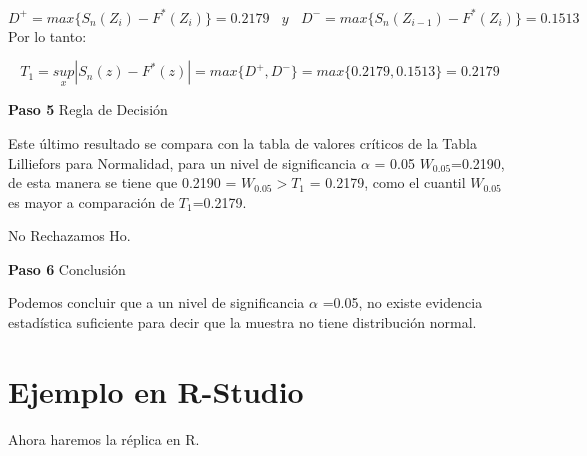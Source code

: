 \documentclass[a4paper,oneside,openany]{book}
\begin{document}
\[ D^+= max \{ S_{n}(Z_{i})-F^*(Z_{i})\}= 0.2179 \ \ \ \ y\ \ \ \ D^-= max \{ S_{n}(Z_{i-1})-F^*(Z_{i})\}=0.1513 \]
Por lo tanto:

\[T_{1}=\underset{x}{sup}|S_{n}(z)-F^*(z)|=max\{ D^+,D^-\}=max\{ 0.2179,0.1513\}=0.2179 \]

\textbf{Paso 5} Regla de Decisión

Este último resultado se compara con la tabla de valores críticos de la
Tabla Lilliefors para Normalidad, para un nivel de significancia
\(\alpha\) = 0.05 \(W_{0.05}\)=0.2190, de esta manera se tiene que
0.2190 = \(W_{0.05} > T_{1}\) = 0.2179, como el cuantil \(W_{0.05}\) es
mayor a comparación de \(T_{1}\)=0.2179.

No Rechazamos Ho.

\textbf{Paso 6} Conclusión

Podemos concluir que a un nivel de significancia \(\alpha\) =0.05, no
existe evidencia estadística suficiente para decir que la muestra no
tiene distribución normal.

\section{Ejemplo en R-Studio}\label{ejemplo-en-r-studio-15}

Ahora haremos la réplica en R.
\end{document}
